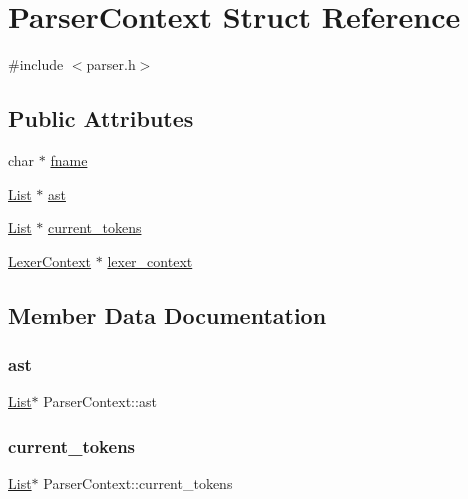\hypertarget{structParserContext}{}\section{Parser\+Context Struct Reference}
\label{structParserContext}


{\ttfamily \#include $<$parser.\+h$>$}

\subsection*{Public Attributes}
\begin{DoxyCompactItemize}
\item 
char $\ast$ \hyperlink{structParserContext_acecd9242efc7d4ac9541209881877a62}{fname}
\item 
\hyperlink{structList}{List} $\ast$ \hyperlink{structParserContext_ae4b0dfa4f0883683ec5da0ef969825f9}{ast}
\item 
\hyperlink{structList}{List} $\ast$ \hyperlink{structParserContext_afe552d8555bb1ec960c72a0fd719f33b}{current\+\_\+tokens}
\item 
\hyperlink{structLexerContext}{Lexer\+Context} $\ast$ \hyperlink{structParserContext_adf2eb8d7e9618a07480cf5859b7dbad5}{lexer\+\_\+context}
\end{DoxyCompactItemize}


\subsection{Member Data Documentation}
\hypertarget{structParserContext_ae4b0dfa4f0883683ec5da0ef969825f9}{}\label{structParserContext_ae4b0dfa4f0883683ec5da0ef969825f9} 
\subsubsection{\texorpdfstring{ast}{ast}}
{\footnotesize\ttfamily \hyperlink{structList}{List}$\ast$ Parser\+Context\+::ast}

\hypertarget{structParserContext_afe552d8555bb1ec960c72a0fd719f33b}{}\label{structParserContext_afe552d8555bb1ec960c72a0fd719f33b} 
\subsubsection{\texorpdfstring{current\+\_\+tokens}{current\_tokens}}
{\footnotesize\ttfamily \hyperlink{structList}{List}$\ast$ Parser\+Context\+::current\+\_\+tokens}

